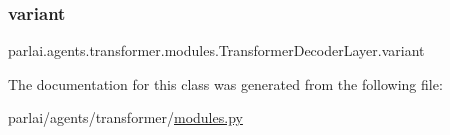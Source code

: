 \subsubsection{\texorpdfstring{variant}{variant}}
{\footnotesize\ttfamily parlai.\+agents.\+transformer.\+modules.\+Transformer\+Decoder\+Layer.\+variant}



The documentation for this class was generated from the following file\+:\begin{DoxyCompactItemize}
\item 
parlai/agents/transformer/\hyperlink{parlai_2agents_2transformer_2modules_8py}{modules.\+py}\end{DoxyCompactItemize}
